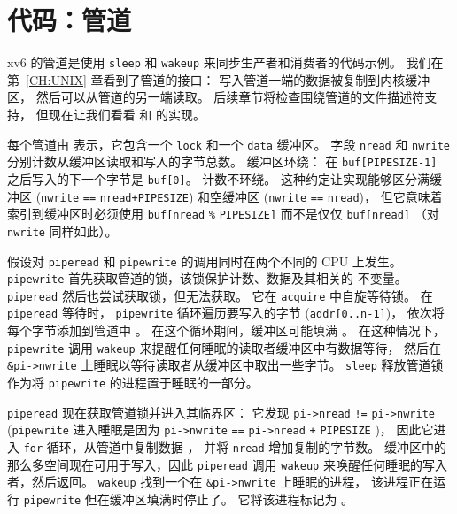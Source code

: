 \section{代码：管道}
xv6 的管道是使用
\lstinline{sleep}
和 \lstinline{wakeup} 来同步生产者和消费者的代码示例。
我们在第~\ref{CH:UNIX} 章看到了管道的接口：
写入管道一端的数据被复制到内核缓冲区，
然后可以从管道的另一端读取。
后续章节将检查围绕管道的文件描述符支持，
但现在让我们看看
和
的实现。

每个管道由
表示，它包含一个
\lstinline{lock}
和一个
\lstinline{data}
缓冲区。
字段
\lstinline{nread}
和
\lstinline{nwrite}
分别计数从缓冲区读取和写入的字节总数。
缓冲区环绕：
在
\lstinline{buf[PIPESIZE-1]}
之后写入的下一个字节是
\lstinline{buf[0]}。
计数不环绕。
这种约定让实现能够区分满缓冲区
(\lstinline{nwrite}
\lstinline{==}
\lstinline{nread+PIPESIZE})
和空缓冲区
(\lstinline{nwrite}
\lstinline{==}
\lstinline{nread})，
但它意味着索引到缓冲区时必须使用
\lstinline{buf[nread}
\lstinline{%}
\lstinline{PIPESIZE]}
而不是仅仅
\lstinline{buf[nread]}
（对
\lstinline{nwrite}
同样如此）。

假设对
\lstinline{piperead}
和
\lstinline{pipewrite}
的调用同时在两个不同的 CPU 上发生。
\lstinline{pipewrite}
首先获取管道的锁，该锁保护计数、数据及其相关的
不变量。
\lstinline{piperead}
然后也尝试获取锁，但无法获取。
它在
\lstinline{acquire}
中自旋等待锁。
在
\lstinline{piperead}
等待时，
\lstinline{pipewrite}
循环遍历要写入的字节
(\lstinline{addr[0..n-1]})，
依次将每个字节添加到管道中
。
在这个循环期间，缓冲区可能填满
。
在这种情况下，
\lstinline{pipewrite}
调用
\lstinline{wakeup}
来提醒任何睡眠的读取者缓冲区中有数据等待，
然后在
\lstinline{&pi->nwrite}
上睡眠以等待读取者从缓冲区中取出一些字节。
\lstinline{sleep}
释放管道锁作为将
\lstinline{pipewrite}
的进程置于睡眠的一部分。

\lstinline{piperead}
现在获取管道锁并进入其临界区：
它发现
\lstinline{pi->nread}
\lstinline{!=}
\lstinline{pi->nwrite}
(\lstinline{pipewrite}
进入睡眠是因为
\lstinline{pi->nwrite}
\lstinline{==}
\lstinline{pi->nread}
\lstinline{+}
\lstinline{PIPESIZE}
)，
因此它进入
\lstinline{for}
循环，从管道中复制数据
，
并将
\lstinline{nread}
增加复制的字节数。
缓冲区中的那么多空间现在可用于写入，因此
\lstinline{piperead}
调用
\lstinline{wakeup}
来唤醒任何睡眠的写入者，然后返回。
\lstinline{wakeup}
找到一个在
\lstinline{&pi->nwrite}
上睡眠的进程，
该进程正在运行
\lstinline{pipewrite}
但在缓冲区填满时停止了。
它将该进程标记为
。

